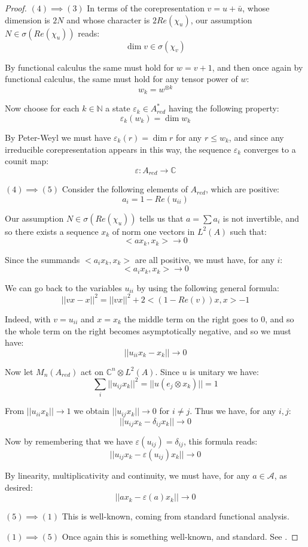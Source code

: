 \documentclass[12pt]{amsbook}
\begin{document}
\begin{proof}
\medskip

$(4)\implies(3)$ In terms of the corepresentation $v=u+\bar{u}$, whose dimension is $2N$ and whose character is $2Re(\chi_u)$, our assumption $N\in\sigma(Re(\chi_u))$ reads:
$$\dim v\in\sigma(\chi_v)$$

By functional calculus the same must hold for $w=v+1$, and then once again by functional calculus, the same must hold for any tensor power of $w$:
$$w_k=w^{\otimes k}$$ 

Now choose for each $k\in\mathbb N$ a state $\varepsilon_k\in A_{red}^*$ having the following property:
$$\varepsilon_k(w_k)=\dim w_k$$

By Peter-Weyl we must have $\varepsilon_k(r)=\dim r$ for any $r\leq w_k$, and since any irreducible corepresentation appears in this way, the sequence $\varepsilon_k$ converges to a counit map: 
$$\varepsilon:A_{red}\to\mathbb C$$

$(4)\implies(5)$ Consider the following elements of $A_{red}$, which are positive:
$$a_i=1-Re(u_{ii})$$
 
Our assumption $N\in\sigma(Re(\chi_u))$ tells us that $a=\sum a_i$ is not invertible, and so there exists a sequence $x_k$ of norm one vectors in $L^2(A)$ such that: 
$$<ax_k,x_k>\to 0$$

Since the summands $<a_ix_k,x_k>$ are all positive, we must have, for any $i$:
$$<a_ix_k,x_k>\to0$$

We can go back to the variables $u_{ii}$ by using the following general formula:
$$||vx-x||^2=||vx||^2 +2<(1-Re(v))x,x>-1$$

Indeed, with $v=u_{ii}$ and $x=x_k$ the middle term on the right goes to 0, and so the whole term on the right becomes asymptotically negative, and so we must have:
$$||u_{ii}x_k-x_k||\to0$$

Now let $M_n(A_{red})$ act on $\mathbb C^n\otimes L^2(A)$. Since $u$ is unitary we have:
$$\sum_i||u_{ij}x_k||^2
=||u(e_j\otimes x_k)||
=1$$

From $||u_{ii}x_k||\to1$ we obtain $||u_{ij}x_k||\to0$ for $i\neq j$. Thus we have, for any $i,j$:
$$||u_{ij}x_k-\delta_{ij}x_k||\to0$$

Now by remembering that we have $\varepsilon(u_{ij})=\delta_{ij}$, this formula reads:
$$||u_{ij}x_k-\varepsilon(u_{ij})x_k||\to0$$

By linearity, multiplicativity and continuity, we must have, for any $a\in\mathcal  A$, as desired:
$$||ax_k-\varepsilon(a)x_k||\to0$$

$(5)\implies(1)$ This is well-known, coming from standard functional analysis.

\medskip

$(1)\implies(5)$ Once again this is something well-known, and standard. See \cite{wo1}.
\end{proof}
\end{document}
